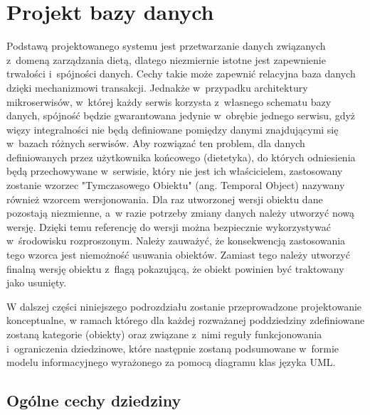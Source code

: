 
\section{Projekt bazy danych}\label{sec:database}

Podstawą projektowanego systemu jest przetwarzanie danych związanych z~domeną zarządzania dietą, dlatego niezmiernie istotne jest zapewnienie trwałości i~spójności danych.
Cechy takie może zapewnić relacyjna baza danych dzięki mechanizmowi transakcji\cite{book:bazury}.
Jednakże w~przypadku architektury mikroserwisów, w~której każdy serwis korzysta z~własnego schematu bazy danych, spójność będzie gwarantowana jedynie w~obrębie jednego serwisu,
gdyż więzy integralności nie będą definiowane pomiędzy danymi znajdującymi się w~bazach różnych serwisów.
Aby rozwiązać ten problem, dla danych definiowanych przez użytkownika końcowego (dietetyka), do których odniesienia będą przechowywane w~serwisie, który nie jest ich właścicielem,
zastosowany zostanie wzorzec "Tymczasowego Obiektu" (ang. Temporal Object)\cite{url:temporal-object-pattern} nazywany również wzorcem wersjonowania.
Dla raz utworzonej wersji obiektu dane pozostają niezmienne, a~w razie potrzeby zmiany danych należy utworzyć nową wersję.
Dzięki temu referencję do wersji można bezpiecznie wykorzystywać w~środowisku rozproszonym.
Należy zauważyć, że konsekwencją zastosowania tego wzorca jest niemożność usuwania obiektów.
Zamiast tego należy utworzyć finalną wersję obiektu z~flagą pokazującą, że obiekt powinien być traktowany jako usunięty.

\par
W dalszej części niniejszego podrozdziału zostanie przeprowadzone projektowanie konceptualne,
w ramach którego dla każdej rozważanej poddziedziny zdefiniowane zostaną kategorie (obiekty) oraz związane z~nimi reguły funkcjonowania i~ograniczenia dziedzinowe\cite{book:bazury},
które następnie zostaną podsumowane w~formie modelu informacyjnego wyrażonego za pomocą diagramu klas języka UML.

\subsection{Ogólne cechy dziedziny}\label{ssubsubsec:database:domain}
